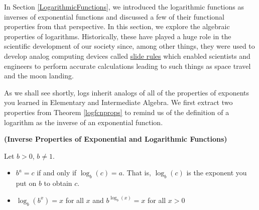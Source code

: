 

\setcounter{footnote}{0}

\label{PropertiesofLogarithms}

In Section \ref{LogarithmicFunctions}, we introduced the logarithmic functions as inverses of exponential functions and discussed a few of their functional properties from that perspective.  In this section, we explore the algebraic properties of logarithms.  Historically, these have played a huge role in the scientific development of our society since, among other things, they were used to develop analog computing devices called \href{http://en.wikipedia.org/wiki/Slide_rule}{\underline{slide rules}} which enabled scientists and engineers to perform accurate calculations leading to such things as space travel and the moon landing.  

\smallskip

As we shall see shortly, logs inherit analogs of all of the properties of exponents you learned in Elementary and Intermediate Algebra.  We first extract two properties from Theorem \ref{logfcnprops} to remind us of the definition of a logarithm as the inverse of an exponential function.
\smallskip

\colorbox{ResultColor}{\bbm

\begin{thm}  \label{invpropslogs} \textbf{(Inverse Properties of Exponential and Logarithmic Functions)} 

Let $b > 0$, $b \neq 1$. 

\vspace{-.1in}

\begin{itemize}

\item   $b^{a} = c$ if and only if $\log_{b}(c) = a$.   That is, $\log_{b}(c)$ is the exponent you put on $b$ to obtain $c$.

\item  $\log_{b} \left(b^{x}\right) = x$ for all $x$ and $b^{\log_{b}(x)} = x$ for all $x > 0$

\end{itemize}

\end{thm}

\ebm}

\smallskip

